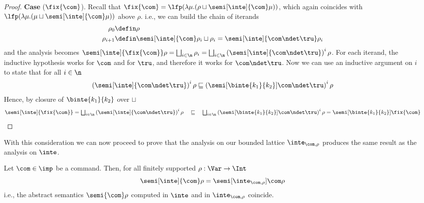 \begin{proof}
  \medskip

  \noindent
  \textbf{Case} (\(\fix{\com}\)).
  Recall that
  \(\fix{\com} = {\lfp(\lambda \mu . (\rho \sqcup
    \semi[\inte]{\com}\mu))}\), which again coincides with
  \({\lfp(\lambda \mu . (\mu \sqcup \semi[\inte]{\com}\mu))}\) above
  \(\rho\). i.e., we can build the chain of iterands
  \begin{align*}
    \rho_0 & \defin \rho \\
    \rho_{i+1} & \defin \semi[\inte]{\com}\rho_i \sqcup \rho_i = \semi[\inte]{\com \ndet \tru}\rho_i
  \end{align*}
  and the analysis becomes
  \({\semi[\inte]{\fix{\com}}\rho} =
  {\textstyle\bigsqcup_{i\in\n}\rho_i} =
  {\textstyle\bigsqcup_{i\in\n}\left(\semi[\inte]{\com \ndet
        \tru}\right)^i\rho}\).  For each iterand, the inductive
  hypothesis works for \(\com\) and for \(\tru\), and therefore it
  works for \(\com \ndet \tru\). Now we can use an inductive argument
  on \(i\) to state that for all \(i \in\n\)
  \begin{equation*}
    {\left(\semi[\inte]{\com\ndet\tru}\right)^i\rho} \sqsubseteq {\left(\semi[\binte{k_1}{k_2}]{\com\ndet\tru}\right)^i\rho}
  \end{equation*}
  Hence, by closure of \(\binte{k_1}{k_2}\) over \(\sqcup\)
  \begin{equation*}
    {\semi[\inte]{\fix{\com}}} =
    {\textstyle\bigsqcup_{i\in\n}\left(\semi[\inte]{\com\ndet\tru}\right)^i \rho}
    \quad \sqsubseteq \quad
    {\textstyle\bigsqcup_{i\in\n}\left(\semi[\binte{k_1}{k_2}]{\com\ndet\tru}\right)^i \rho} =
    {\semi[\binte{k_1}{k_2}]{\fix{\com}}}
  \end{equation*}

\end{proof}
With this consideration we can now proceed to prove that the analysis
on our bounded lattice \(\inte_{\com,\rho}\) produces the same result
as the analysis on \(\inte\).



\begin{lemma}
  Let \(\com\in \imp\) be a command. Then, for all finitely supported
  \(\rho : \Var \to \Int\)
  \begin{equation*}
    \semi[\inte]{\com}\rho = \semi[\inte_{\com,\rho}]{\com}\rho
  \end{equation*}
  i.e., the abstract semantics \(\semi{\com} \rho\)
  computed in \(\inte\) and in \(\inte_{\com,\rho}\) coincide.
\end{lemma}

